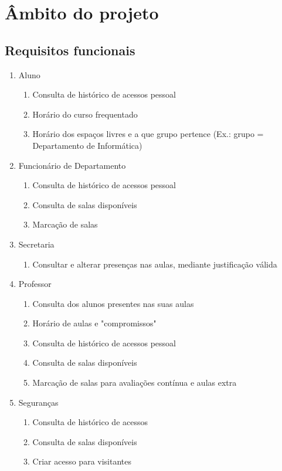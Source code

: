 \documentclass[a4paper]{report}
\begin{document}
\chapter{Âmbito do projeto}
\section{Requisitos funcionais}
\begin{enumerate}
\item Aluno
	\begin{enumerate}
	\item Consulta de histórico de acessos pessoal
    \item Horário do curso frequentado
    \item Horário dos espaços livres e a que grupo pertence (Ex.: grupo = Departamento de Informática)
	\end{enumerate}
\item Funcionário de Departamento
	\begin{enumerate}
	\item Consulta de histórico de acessos pessoal
    \item Consulta de salas disponíveis
    \item Marcação de salas
	\end{enumerate}
\item Secretaria
	\begin{enumerate}
    \item Consultar e alterar presenças nas aulas, mediante justificação válida
	\end{enumerate}
\item Professor
	\begin{enumerate}
	\item Consulta dos alunos presentes nas suas aulas
    \item Horário de aulas e "compromissos"
	\item Consulta de histórico de acessos pessoal
    \item Consulta de salas disponíveis
    \item Marcação de salas para avaliações contínua e aulas extra
	\end{enumerate}
\item Seguranças
	\begin{enumerate}
    \item Consulta de histórico de acessos
    \item Consulta de salas disponíveis
    \item Criar acesso para visitantes

\end{enumerate}
\end{enumerate}
\end{document}
